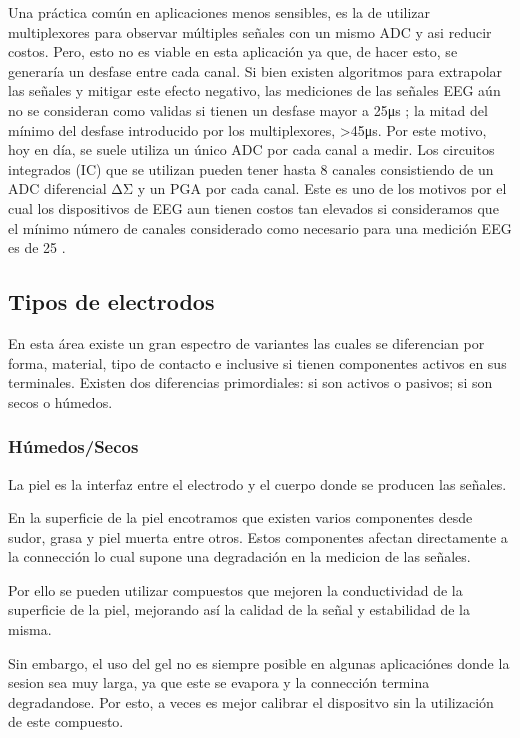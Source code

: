 Una práctica común en aplicaciones menos sensibles, es la de utilizar multiplexores para observar múltiples señales con un mismo ADC y asi reducir costos. Pero, esto no es viable en esta aplicación ya que, de hacer esto, se generaría un desfase entre cada canal. Si bien existen algoritmos para extrapolar las señales y mitigar este efecto negativo, las mediciones de las señales EEG aún no se consideran como validas si tienen un desfase mayor a 25μs \cite{IFCN1999a}; la mitad del mínimo del desfase introducido por los multiplexores, >45μs. Por este motivo, hoy en día, se suele utiliza un único ADC por cada canal a medir. Los circuitos integrados (IC) que se utilizan pueden tener hasta 8 canales consistiendo de un ADC diferencial ΔΣ y un PGA por cada canal. Este es uno de los motivos por el cual los dispositivos de EEG aun tienen costos tan elevados si consideramos que el mínimo número de canales considerado como necesario para una medición EEG es de 25 \cite{IFCN1999a}.

\subsection{Tipos de electrodos}
\label{sec:org5eff86f}
En esta área existe un gran espectro de variantes las cuales se diferencian por forma, material, tipo de contacto e inclusive si tienen componentes activos en sus terminales. Existen dos diferencias primordiales: si son activos o pasivos; si son secos o húmedos.

\subsubsection{Húmedos/Secos}
\label{sec:org7b5b372}
La piel es la interfaz entre el electrodo y el cuerpo donde se producen las señales.

En la superficie de la piel encotramos que existen varios componentes desde sudor, grasa y piel muerta entre otros. Estos componentes afectan directamente a la connección lo cual supone una degradación en la medicion de las señales.

Por ello se pueden utilizar compuestos que mejoren la conductividad de la superficie de la piel, mejorando así la calidad de la señal y estabilidad de la misma.

Sin embargo, el uso del gel no es siempre posible en algunas aplicaciónes donde la sesion sea muy larga, ya que este se evapora y la connección termina degradandose. Por esto, a veces es mejor calibrar el dispositvo sin la utilización de este compuesto.

